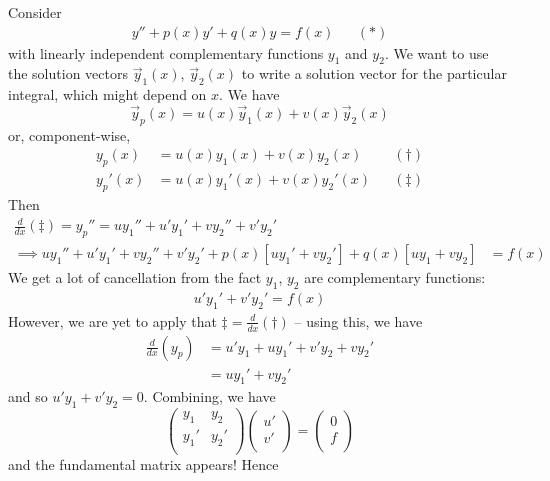 \documentclass{../template/note}
\begin{document}
    Consider
    \begin{align*}
        y'' + p(x)y' + q(x)y = f(x) && (*)
    \end{align*}
    with linearly independent complementary functions \(y_1\) and \(y_2\). We want to use the solution vectors \(\vec y_1(x)\), \(\vec y_2(x)\) to write a solution vector for the particular integral, which might depend on \(x\). We have
    \[
        \vec y_p(x) = u(x) \vec y_1(x) + v(x) \vec y_2(x)
    \]
    or, component-wise,
    \begin{align*}
        y_p(x) &= u(x)y_1(x) + v(x)y_2(x) && (\dagger) \\
        y_p'(x) &= u(x)y_1'(x) + v(x)y_2'(x) && (\ddagger)
    \end{align*}
    Then
    \begin{align*}
        \frac{d}{dx}(\ddagger) = y_p'' = uy_1'' + u'y_1' + vy_2'' + v'y_2'& \\
        \implies uy_1'' + u'y_1' + vy_2'' + v'y_2' + p(x)[uy_1' + vy_2'] + q(x)[uy_1 + vy_2] &= f(x)
    \end{align*}
    We get a lot of cancellation from the fact \(y_1\), \(y_2\) are complementary functions:
    \begin{align*}
        u'y_1' + v'y_2' = f(x)
    \end{align*}
    However, we are yet to apply that \(\ddagger = \frac{d}{dx}(\dagger)\) -- using this, we have
    \begin{align*}
        \frac{d}{dx}(y_p) &= u'y_1 + uy_1' + v'y_2 + vy_2' \\
        &= uy_1' + vy_2'
    \end{align*}
    and so \(u'y_1 + v'y_2 = 0\). Combining, we have
    \[
        \begin{pmatrix}
         y_1 & y_2 \\
         y_1' & y_2' \\
        \end{pmatrix}\begin{pmatrix}
         u' \\
         v' \\
        \end{pmatrix} = \begin{pmatrix}
         0 \\
         f \\
        \end{pmatrix}
    \]
    and the fundamental matrix appears! Hence
\end{document}
